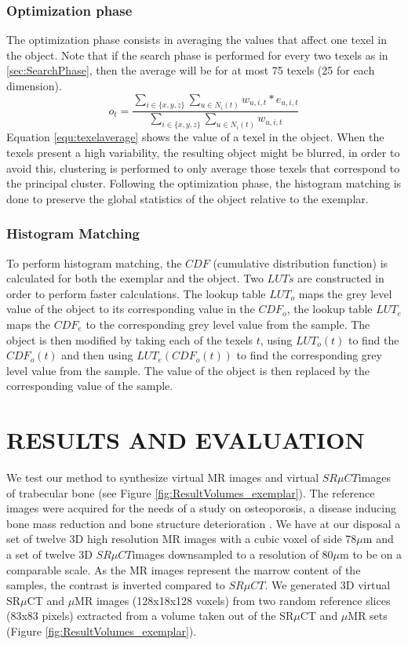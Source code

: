 \documentclass{article}
\begin{document}
\subsubsection{Optimization phase}
\label{sec:OptimizationPhase}
%
The optimization phase consists in averaging the values that affect one texel in the object. Note that
if the search phase is performed for every two texels as in \ref{sec:SearchPhase}, 
then the average will be for at most 75 texels (25 for each dimension).
%
\begin{equation}
 o_t = \frac{ \sum_{i \in \{x, y, z\}} \sum_{u \in N_i(t)} w_{u, i, t} * e_{u, i, t} }{ \sum_{i \in \{x, y, z\}} \sum_{u \in N_i(t)} w_{u, i, t} }
 \label{equ:texelaverage}
\end{equation}
%
Equation \ref{equ:texelaverage} shows the value of a texel in the object. 
When the texels present a high variability, the resulting object might be
blurred, in order to avoid this, 
clustering is performed to only average those texels that correspond to the principal cluster.
%
Following the optimization phase, the histogram matching is done to preserve the 
global statistics of the object relative to the exemplar.  

\subsubsection{Histogram Matching}
\label{sec:histogramMatching}
%
To perform histogram matching, the $CDF$ (cumulative distribution function) is calculated for both the exemplar and the object. 
Two $LUTs$ are constructed in order to perform faster calculations. The lookup table $LUT_o$ maps the grey level value of the object
to its corresponding value in the $CDF_o$, the lookup table $LUT_e$ maps the $CDF_e$
to the corresponding grey level value from the sample. 
The object is then modified by taking each of the texels $t$, using $LUT_o(t)$ to find the $CDF_o(t)$
and then using $LUT_e(CDF_o(t))$ to find the corresponding grey level value from the sample. The value of the object is then replaced 
by the corresponding value of the sample.

\section{\uppercase{Results and Evaluation}}
\label{sec:ResultsAndEvaluation}
We test our method to synthesize virtual MR images and virtual $SR \mu{CT}$images of trabecular bone (see Figure \ref{fig:ResultVolumes_exemplar}). 
The reference images were acquired for the needs of a study on osteoporosis, a disease inducing bone mass 
reduction and bone structure deterioration \cite{revol2002}. 
We have at our disposal a set of twelve 3D high resolution MR images with a cubic voxel of side 78$\mu$m and a set of twelve 3D 
$SR \mu{CT}$images downsampled to a resolution of 80$\mu$m to be on a comparable scale. As the MR images represent the marrow content of the samples, 
the contrast is inverted compared to $SR \mu{CT}$.
We generated 3D virtual SR$\mu$CT and $\mu$MR images (128x18x128 voxels) from two random reference slices (83x83 pixels) 
extracted from a volume taken out of the SR$\mu$CT and $\mu$MR sets (Figure \ref{fig:ResultVolumes_exemplar}).  
 
\end{document}
